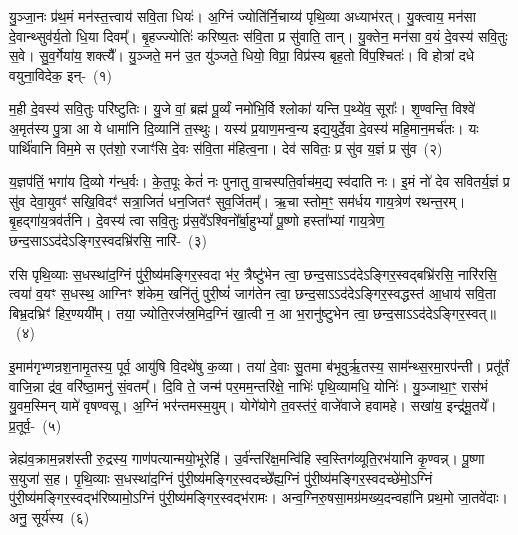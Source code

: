 \label{sec:startkanda4}
\setcounter{anuvakam}{0}
यु॒ञ्जा॒नः प्र॑थ॒मं मन॑स्त॒त्त्वाय॑ सवि॒ता धियः॑। अ॒ग्निं ज्योति॑र्नि॒चाय्य॑ पृथि॒व्या अध्याभ॑रत्। यु॒क्त्वाय॒ मन॑सा दे॒वान्थ्सुव॑र्य॒तो धि॒या दिवम्᳚। बृ॒हज्ज्योतिः॑ करिष्य॒तः स॑वि॒ता प्र सु॑वाति॒ तान्। यु॒क्तेन॒ मन॑सा व॒यं दे॒वस्य॑ सवि॒तुः स॒वे। सु॒व॒र्गेया॑य॒ शक्त्यै᳚। यु॒ञ्जते॒ मन॑ उ॒त यु॑ञ्जते॒ धियो॒ विप्रा॒ विप्र॑स्य बृह॒तो वि॑प॒श्चितः॑। वि होत्रा॑ दधे वयुना॒विदेक॒ इन्-~(१)\ip

म॒ही दे॒वस्य॑ सवि॒तुः परि॑ष्टुतिः। यु॒जे वां॒ ब्रह्म॑ पू॒र्व्यं नमो॑भि॒र्वि श्लोका॑ यन्ति प॒थ्ये॑व॒ सूराः᳚। शृ॒ण्वन्ति॒ विश्वे॑ अ॒मृत॑स्य पु॒त्रा आ ये धामा॑नि दि॒व्यानि॑ त॒स्थुः। यस्य॑ प्र॒याण॒मन्व॒न्य इद्य॒युर्दे॒वा दे॒वस्य॑ महि॒मान॒मर्च॑तः। यः पार्थि॑वानि विम॒मे स एत॑शो॒ रजाꣳ॑सि दे॒वः स॑वि॒ता म॑हित्व॒ना। देव॑ सवितः॒ प्र सु॑व य॒ज्ञं प्र सु॑व~(२)\ip

य॒ज्ञप॑तिं॒ भगा॑य दि॒व्यो ग॑न्ध॒र्वः। के॒त॒पूः केतं॑ नः पुनातु वा॒चस्पति॒र्वाच॑म॒द्य स्व॑दाति नः। इ॒मं नो॑ देव सवितर्य॒ज्ञं प्र सु॑व देवा॒युवꣳ॑ सखि॒विदꣳ॑ सत्रा॒जितं॑ धन॒जितꣳ॑ सुव॒र्जितम्᳚। ऋ॒चा स्तोम॒ꣳ॒ सम॑र्धय गाय॒त्रेण॑ रथन्त॒रम्। बृ॒हद्गा॑य॒त्रव॑र्तनि। दे॒वस्य॑ त्वा सवि॒तुः प्र॑स॒वे᳚\-ऽश्विनो᳚र्बा॒हु\-भ्यां᳚ पू॒ष्णो हस्ता᳚भ्यां गाय॒त्रेण॒ छन्द॒सा\-ऽऽ\-द॑दे\-ऽङ्गिर॒स्वदभ्रि॑रसि॒ नारि॑-~(३)\ip

रसि पृथि॒व्याः स॒धस्था॑द॒ग्निं पु॑री॒ष्य॑मङ्गिर॒\-स्वदा भ॑र॒ त्रैष्टु॑भेन त्वा॒ छन्द॒सा\-ऽऽ\-द॑दे\-ऽङ्गिर॒स्वद्बभ्रि॑रसि॒ नारि॑रसि॒ त्वया॑ व॒यꣳ स॒धस्थ॒ आग्निꣳ श॑केम॒ खनि॑तुं पुरी॒ष्यं॑ जाग॑तेन त्वा॒ छन्द॒सा\-ऽऽ\-द॑दे\-ऽङ्गिर॒स्वद्धस्त॑ आ॒धाय॑ सवि॒ता बिभ्र॒दभ्रिꣳ॑ हिर॒ण्ययी᳚म्। तया॒ ज्योति॒रज॑स्र॒मिद॒ग्निं खा॒त्वी न॒ आ भ॒रानु॑ष्टुभेन त्वा॒ छन्द॒सा\-ऽऽ\-द॑दे\-ऽङ्गिर॒स्वत्॥~(४)\ip

{\anuvakamend[{इद्य॒ज्ञं प्र सु॑व॒ नारि॒रानु॑ष्टुभेन त्वा॒ छन्द॑सा॒ त्रीणि॑ च}]}

इ॒माम॑गृभ्णन्रश॒नामृ॒तस्य॒ पूर्व॒ आयु॑षि वि॒दथे॑षु क॒व्या। तया॑ दे॒वाः सु॒तमा ब॑भूवुर्\mbox{}ऋ॒तस्य॒ साम᳚न्थ्स॒रमा॒रप॑न्ती। प्रतू᳚र्तं वाजि॒न्ना द्र॑व॒ वरि॑ष्ठा॒मनु॑ सं॒वतम्᳚। दि॒वि ते॒ जन्म॑ पर॒मम॒न्तरि॑क्षे॒ नाभिः॑ पृथि॒व्यामधि॒ योनिः॑। यु॒ञ्जाथा॒ꣳ॒ रास॑भं यु॒वम॒स्मिन् यामे॑ वृषण्वसू। अ॒ग्निं भर॑न्तमस्म॒युम्। योगे॑योगे त॒वस्त॑रं॒ वाजे॑वाजे हवामहे। सखा॑य॒ इन्द्र॑मू॒तये᳚। प्र॒तूर्व॒-~(५)\ip

न्नेह्य॑व॒क्राम॒न्नश॑स्ती रु॒द्रस्य॒ गाण॑पत्यान्मयो॒भूरेहि॑। उ॒र्व॑न्तरि॑क्ष॒\-मन्वि॑हि स्व॒स्तिग॑व्यूति॒\-रभ॑यानि कृ॒ण्वन्न्। पू॒ष्णा स॒युजा॑ स॒ह। पृ॒थि॒व्याः स॒धस्था॑द॒ग्निं पु॑री॒ष्य॑मङ्गिर॒\-स्वदच्छे᳚ह्य॒ग्निं पु॑री॒ष्य॑मङ्गिर॒\-स्वदच्छे॑मो॒\-ऽग्निं पु॑री॒ष्य॑मङ्गिर॒\-स्वद्भ॑रिष्यामो॒\-ऽग्निं पु॑री॒ष्य॑मङ्गिर॒\-स्वद्भ॑रामः। अन्व॒ग्नि\-रु॒ष\-सा॒मग्र॑मख्य॒दन्वहा॑नि प्रथ॒मो जा॒तवे॑दाः। अनु॒ सूर्य॑स्य~(६)\ip

